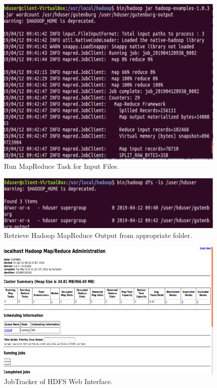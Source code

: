 \documentclass[a4paper,10pt]{article}
\begin{document}
\begin{figure}[h]
	\includegraphics[scale=0.30,center]{exptTwoScreenShot/fig5.png}
	\caption{Run MapReduce Task for Input Files.}
	\label{fig:5}
\end{figure}
\begin{figure}[h]
	\includegraphics[scale=0.50,center]{exptTwoScreenShot/fig6.png}
	\caption{Retrieve Hadoop MapReduce Output from appropriate folder.}
	\label{fig:6}
\end{figure}

	\begin{figure}[h]
		\includegraphics[scale=0.30,center]{exptTwoScreenShot/fig7.png}
		\caption{JobTracker of HDFS Web Interface.}
		\label{fig:7}
	\end{figure}
	
\end{document}
